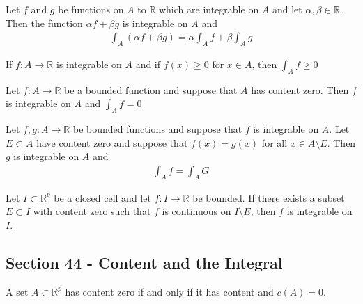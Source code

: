 \documentclass[12pt]{article}
\newcommand{\R}{\mathbb{R}}
\newenvironment{theorem}[2][Theorem]{\begin{trivlist}
\item[\hskip \labelsep {\bfseries #1}\hskip \labelsep {\bfseries #2.}]}{\end{trivlist}}
\newenvironment{lemma}[2][Lemma]{\begin{trivlist}
\item[\hskip \labelsep {\bfseries #1}\hskip \labelsep {\bfseries #2.}]}{\end{trivlist}}
\begin{document}
\begin{theorem}{43.5}
Let $f$ and $g$ be functions on $A$ to $\R$ which are integrable on $A$ and let $\alpha, \beta \in \R$. Then the function $\alpha f + \beta g$ is integrable on $A$ and
\begin{align*}
\int_A (\alpha f + \beta g) = \alpha \int_A f + \beta \int_A g
\end{align*}
\end{theorem}

\begin{theorem}{43.6}
If $f: A \to \R$ is integrable on $A$ and if $f(x) \geq 0$ for $x \in A$, then $\int_A f \geq 0$
\end{theorem}

\begin{theorem}{43.7}
Let $f: A \to \R$ be a bounded function and suppose that $A$ has content zero. Then $f$ is integrable on $A$ and $\int_A f = 0$
\end{theorem}

\begin{theorem}{43.8}
Let $f, g: A \to \R$ be bounded functions and suppose that $f$ is integrable on $A$. Let $E \subset A$ have content zero and suppose that $f(x) = g(x)$ for all $x \in A \setminus E$. Then $g$ is integrable on $A$ and
\begin{align*}
\int_A f = \int_A G
\end{align*}
\end{theorem}

\begin{theorem}[Integrability]{Theorem}
Let $I \subset \R^p$ be a closed cell and let $f: I \to \R$ be bounded. If there exists a subset $E \subset I$ with content zero such that $f$ is continuous on $I \setminus E$, then $f$ is integrable on $I$.
\end{theorem}

\subsection*{Section 44 - Content and the Integral}

\begin{lemma}{44.3}
A set $A \subset \R^p$ has content zero if and only if it has content and $c(A) = 0$.
\end{lemma}
\end{document}

